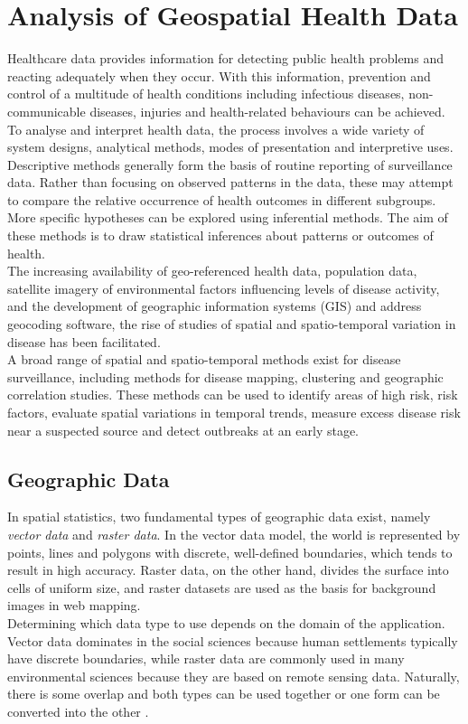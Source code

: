 %

\chapter{Analysis of Geospatial Health Data}
\label{sec:geodata}
Healthcare data provides information for detecting public health problems and reacting adequately when they occur. With this information, prevention and control of a multitude of health conditions including infectious diseases, non-communicable diseases, injuries and health-related behaviours can be achieved. To analyse and interpret health data, the process involves a wide variety of system designs, analytical methods, modes of presentation and interpretive uses\autocite[][]{teutsch2000principles}. Descriptive methods generally form the basis of routine reporting of surveillance data. Rather than focusing on observed patterns in the data, these may attempt to compare the relative occurrence of health outcomes in different subgroups. More specific hypotheses can be explored using inferential methods. The aim of these methods is to draw statistical inferences about patterns or outcomes of health. \\
The increasing availability of geo-referenced health data, population data, satellite imagery of environmental factors influencing levels of disease activity, and the development of geographic information systems (GIS) and address geocoding software, the rise of studies of spatial and spatio-temporal variation in disease has been facilitated. \\
A broad range of spatial and spatio-temporal methods exist for disease surveillance, including methods for disease mapping, clustering and geographic correlation studies. These methods can be used to identify areas of high risk, risk factors, evaluate spatial variations in temporal trends, measure excess disease risk near a suspected source and detect outbreaks at an early stage.
\clearpage
\section{Geographic Data}
In spatial statistics, two fundamental types of geographic data exist, namely \textit{vector data} and \textit{raster data}. In the vector data model, the world is represented by points, lines and polygons with discrete, well-defined boundaries, which tends to result in high accuracy. Raster data, on the other hand, divides the surface into cells of uniform size, and raster datasets are used as the basis for background images in web mapping. \\
Determining which data type to use depends on the domain of the application. Vector data dominates in the social sciences because human settlements typically have discrete boundaries, while raster data are commonly used in many environmental sciences because they are based on remote sensing data. Naturally, there is some overlap and both types can be used together or one form can be converted into the other \autocite[][]{lovelace2019geocomputation}.
